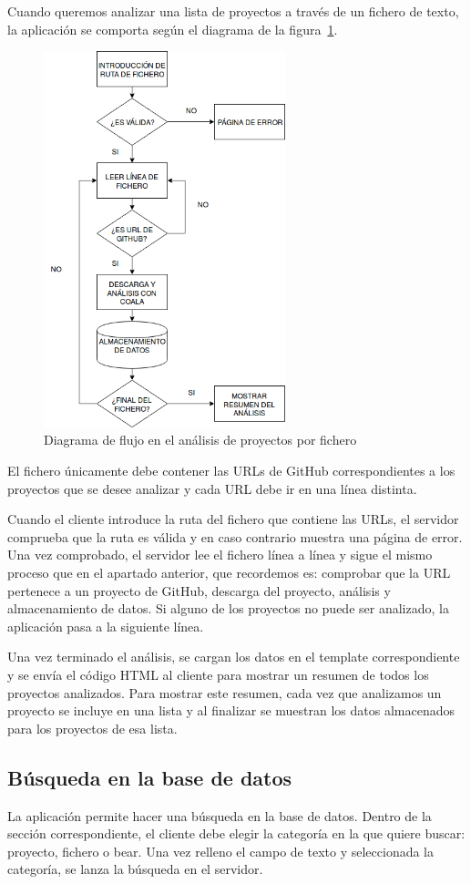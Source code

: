 \documentclass[a4paper, 12pt]{book}
\begin{document}
Cuando queremos analizar una lista de proyectos a través de un fichero de texto, la aplicación se comporta según el diagrama de la figura~\ref{fig:AnalizarFichero}.
\begin{figure}[H]
  \centering
  \includegraphics[width=7cm, keepaspectratio]{img/AnalizarFichero}
  \caption{Diagrama de flujo en el análisis de proyectos por fichero}
  \label{fig:AnalizarFichero}
\end{figure}
El fichero únicamente debe contener las URLs de GitHub correspondientes a los proyectos que se desee analizar y cada URL debe ir en una línea distinta.

Cuando el cliente introduce la ruta del fichero que contiene las URLs, el servidor comprueba que la ruta es válida y en caso contrario muestra una página de error. Una vez comprobado, el servidor lee el fichero línea a línea y sigue el mismo proceso que en el apartado anterior, que recordemos es: comprobar que la URL pertenece a un proyecto de GitHub, descarga del proyecto, análisis y almacenamiento de datos. Si alguno de los proyectos no puede ser analizado, la aplicación pasa a la siguiente línea.

Una vez terminado el análisis, se cargan los datos en el template correspondiente y se envía el código HTML al cliente para mostrar un resumen de todos los proyectos analizados. Para mostrar este resumen, cada vez que analizamos un proyecto se incluye en una lista y al finalizar se muestran los datos almacenados para los proyectos de esa lista.

\subsection{Búsqueda en la base de datos}
\label{sec:seccion12.2}
La aplicación permite hacer una búsqueda en la base de datos. Dentro de la sección correspondiente, el cliente debe elegir la categoría en la que quiere buscar: proyecto, fichero o bear. Una vez relleno el campo de texto y seleccionada la categoría, se lanza la búsqueda en el servidor.
\end{document}
